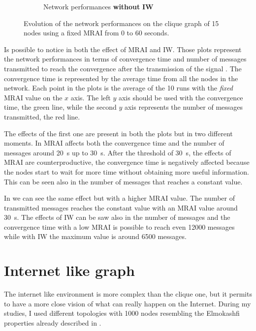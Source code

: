 \begin{figure}[h]
\begin{subfigure}[b]{0.45\textwidth}
		 \caption{Network performances \textbf{without} \textbf{\ac{IW}}}
         \label{fig:clique_evolution_noIW}
     \end{subfigure}
		\caption{Evolution of the network performances on the clique graph of \num{15}
			nodes using a fixed \ac{MRAI} from \num{0} to \num{60} seconds. }
        \label{fig:clique_evolution}
\end{figure}

Is possible to notice in  both the effect of \ac{MRAI}
and \ac{IW}.
Those plots represent the network performances in terms of convergence time and
number of messages transmitted to reach the convergence after the transmission 
of the signal .
The convergence time is represented by the average time from all the nodes in the 
network.
Each point in the plots is the average of the \num{10} runs with the \textit{fixed}
\ac{MRAI} value on the $x$ axis.
The left $y$ axis should be used with the convergence time, the green line, while
the second $y$ axis represents the number of messages transmitted, the red line.

The effects of the first one are present in both the plots but in two different
moments.
In  \ac{MRAI} affects both the convergence time and
the number of messages around \SI{20}{\second} up to \SI{30}{\second}.
After the threshold of \SI{30}{\second}, the effects of \ac{MRAI} are counterproductive,
the convergence time is negatively affected because the nodes start to wait for more
time without obtaining more useful information.
This can be seen also in the number of messages that reaches a constant value.

In  we can see the same effect but with a higher
\ac{MRAI} value.
The number of transmitted messages reaches the constant value with an \ac{MRAI}
value around \SI{30}{\second}.
The effects of \ac{IW} can be saw also in the number of messages and the convergence
time with a low \ac{MRAI} is possible to reach even \num{12000} messages while
with \ac{IW} the maximum value is around \num{6500} messages.


\section{Internet like graph}
\label{sec:bgp_mrai_internet_like}

The internet like environment is more complex than the clique one, but it permits
to have a more close vision of what can really happen on the Internet.
During my studies, I used different topologies with \num{1000} nodes resembling 
the Elmokashfi properties \cite{elmokashfi2010scalability} already 
described in .

